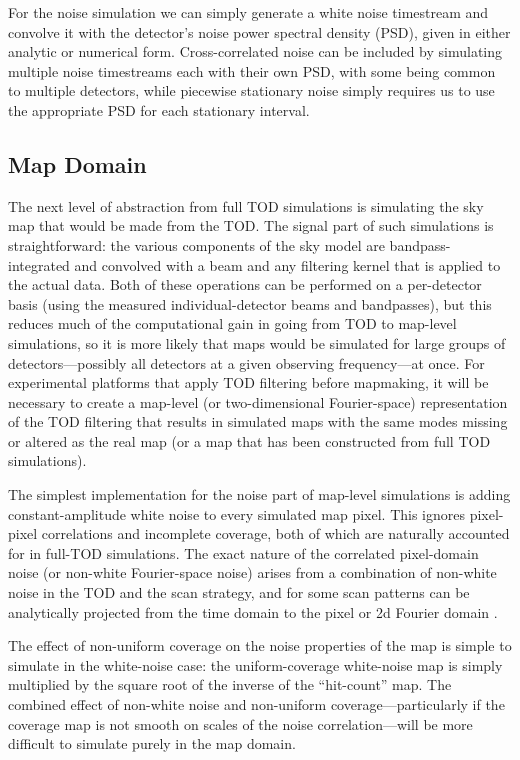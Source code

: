 For the noise simulation we can simply generate a white noise timestream and convolve it with the detector's noise power spectral density (PSD), given in either analytic or numerical form. Cross-correlated noise can be included by simulating multiple noise timestreams each with their own PSD, with some being common to multiple detectors, while piecewise stationary noise simply requires us to use the appropriate PSD for each stationary interval.

\subsection{Map Domain}

The next level of abstraction from full TOD simulations is simulating the sky map that would be made
from the TOD. The signal part of such simulations is straightforward: the various components of the sky
model are bandpass-integrated and convolved with a beam and any filtering kernel that is applied to the 
actual data. Both of these operations can be performed on a per-detector basis (using the measured 
individual-detector beams and bandpasses), but this reduces much of the computational gain in going from
TOD to map-level simulations, so it is more likely that maps would be simulated for large groups of
detectors---possibly all detectors at a given observing frequency---at once. For experimental platforms that 
apply TOD filtering before mapmaking, it will be necessary to create a map-level (or two-dimensional 
Fourier-space) representation of the TOD filtering that results in simulated maps with the same modes
missing or altered as the real map (or a map that has been constructed from full TOD simulations).

The simplest implementation for the noise part of map-level simulations is adding constant-amplitude
white noise to every simulated map pixel. This ignores pixel-pixel correlations and incomplete coverage, 
both of which are naturally accounted for in full-TOD simulations. The exact nature of the 
correlated pixel-domain noise 
(or non-white Fourier-space noise) arises from a combination of non-white noise in the TOD 
and the scan strategy, and for some scan patterns can be analytically projected from the time domain
to the pixel or 2d Fourier domain \cite{Wandelt:2001fz,Crawford:2007mh,Bucher:2016ysw}. 

The effect of non-uniform coverage on the noise properties of the map is simple to simulate
in the white-noise case: the uniform-coverage white-noise map is simply multiplied by the square
root of the inverse of the ``hit-count'' map. The combined effect of non-white noise and non-uniform
coverage---particularly if the coverage map is not smooth on scales of the noise correlation---will
be more difficult to simulate purely in the map domain.

